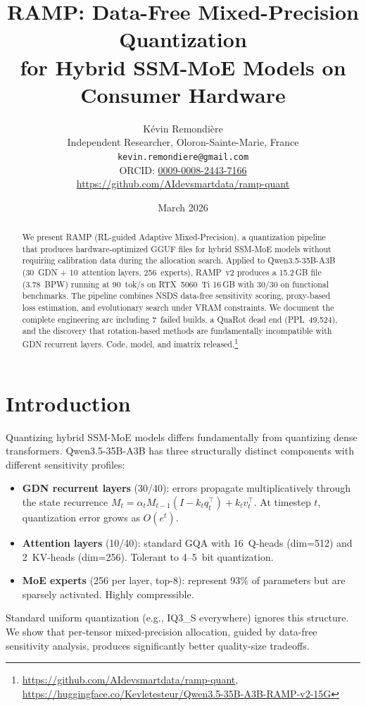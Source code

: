 \documentclass[10pt,a4paper]{article}
\title{RAMP: Data-Free Mixed-Precision Quantization\\for Hybrid SSM-MoE Models on Consumer Hardware}
\author{
  K\'evin Remondi\`ere\\
  Independent Researcher, Oloron-Sainte-Marie, France\\
  \texttt{kevin.remondiere@gmail.com}\\
  ORCID: \href{https://orcid.org/0009-0008-2443-7166}{0009-0008-2443-7166}\\
  \url{https://github.com/AIdevsmartdata/ramp-quant}
}
\date{March 2026}
\begin{document}
\maketitle

\begin{abstract}
We present RAMP (RL-guided Adaptive Mixed-Precision), a quantization pipeline that produces hardware-optimized GGUF files for hybrid SSM-MoE models without requiring calibration data during the allocation search. Applied to Qwen3.5-35B-A3B (30~GDN + 10~attention layers, 256~experts), RAMP~v2 produces a 15.2\,GB file (3.78~BPW) running at 90~tok/s on RTX~5060~Ti 16\,GB with 30/30 on functional benchmarks. The pipeline combines NSDS data-free sensitivity scoring, proxy-based loss estimation, and evolutionary search under VRAM constraints. We document the complete engineering arc including 7~failed builds, a QuaRot dead end (PPL~49{,}524), and the discovery that rotation-based methods are fundamentally incompatible with GDN recurrent layers. Code, model, and imatrix released.\footnote{\url{https://github.com/AIdevsmartdata/ramp-quant}, \url{https://huggingface.co/Kevletesteur/Qwen3.5-35B-A3B-RAMP-v2-15G}}
\end{abstract}

\section{Introduction}

Quantizing hybrid SSM-MoE models differs fundamentally from quantizing dense transformers. Qwen3.5-35B-A3B has three structurally distinct components with different sensitivity profiles:

\begin{itemize}
  \item \textbf{GDN recurrent layers} (30/40): errors propagate multiplicatively through the state recurrence $M_t = \alpha_t M_{t-1}(I - k_t q_t^\top) + k_t v_t^\top$. At timestep $t$, quantization error grows as $O(e^t)$.
  \item \textbf{Attention layers} (10/40): standard GQA with 16~Q-heads (dim=512) and 2~KV-heads (dim=256). Tolerant to 4--5~bit quantization.
  \item \textbf{MoE experts} (256 per layer, top-8): represent 93\% of parameters but are sparsely activated. Highly compressible.
\end{itemize}

Standard uniform quantization (e.g., IQ3\_S everywhere) ignores this structure. We show that per-tensor mixed-precision allocation, guided by data-free sensitivity analysis, produces significantly better quality-size tradeoffs.
\end{document}

